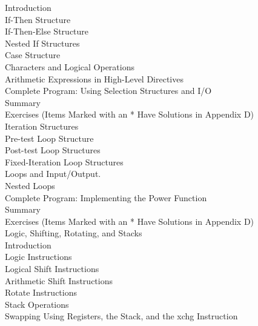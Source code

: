 \documentclass[10pt]{book}
\begin{document}
 Introduction \\
 If-Then Structure \\
 If-Then-Else Structure \\
 Nested If Structures \\
 Case Structure \\
 Characters and Logical Operations \\
 Arithmetic Expressions in High-Level Directives \\
 Complete Program: Using Selection Structures and I/O \\
 Summary \\
 Exercises (Items Marked with an * Have Solutions in Appendix D) \\
 Iteration Structures \\
 Pre-test Loop Structure \\
 Post-test Loop Structures \\
 Fixed-Iteration Loop Structures \\
 Loops and Input/Output. \\
 Nested Loops \\
 Complete Program: Implementing the Power Function \\
 Summary \\
 Exercises (Items Marked with an * Have Solutions in Appendix D) \\
 Logic, Shifting, Rotating, and Stacks \\
 Introduction \\
 Logic Instructions \\
 Logical Shift Instructions \\
 Arithmetic Shift Instructions \\
 Rotate Instructions \\
 Stack Operations \\
 Swapping Using Registers, the Stack, and the xchg Instruction \\
\end{document}
